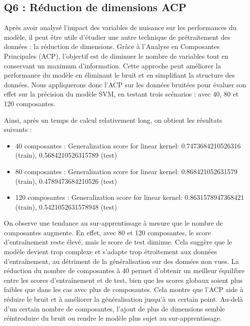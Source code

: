\documentclass{scrartcl}
\begin{document}
\subsection{Q6 : Réduction de dimensions ACP}
\hspace{7pt} Après avoir analysé l'impact des variables de nuisance sur les performances du modèle, il peut être utile d'étudier une autre technique de prétraitement des données : la réduction de dimensions. Grâce à l'Analyse en Composantes Principales (ACP), l'objectif est de diminuer le nombre de variables tout en conservant un maximum d'information. Cette approche peut améliorer la performance du modèle en éliminant le bruit et en simplifiant la structure des données. Nous appliquerons donc l'ACP sur les données bruitées pour évaluer son effet sur la précision du modèle SVM, en testant trois scénarios : avec 40, 80 et 120 composantes.\newline

Ainsi, après un temps de calcul relativement long, on obtient les résultats suivants :
\begin{itemize}
    \item 40 composantes : Generalization score for linear kernel: 0.7473684210526316 (train), 0.5684210526315789 (test) 
    \item 80 composantes : Generalization score for linear kernel: 0.868421052631579 (train), 0.4789473684210526 (test) 
    \item 120 composantes : Generalization score for linear kernel: 0.8631578947368421 (train), 0.5421052631578948 (test) 
\end{itemize}

On observe une tendance au sur-apprentissage à mesure que le nombre de composantes augmente. En effet, avec 80 et 120 composantes, le score d'entraînement reste élevé, mais le score de test diminue. Cela suggère que le modèle devient trop complexe et s'adapte trop étroitement aux données d'entraînement, au détriment de la généralisation sur des données non vues.\newline
La réduction du nombre de composantes à 40 permet d'obtenir un meilleur équilibre entre les scores d'entraînement et de test, bien que les scores globaux soient plus faibles que dans les cas avec plus de composantes. Cela montre que l'ACP aide à réduire le bruit et à améliorer la généralisation jusqu'à un certain point. Au-delà d'un certain nombre de composantes, l'ajout de plus de dimensions semble réintroduire du bruit ou rendre le modèle plus sujet au sur-apprentissage.
\end{document}

